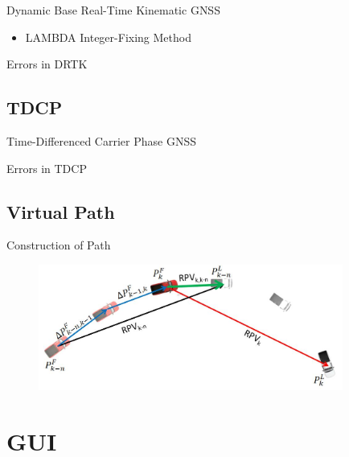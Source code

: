 \documentclass{beamer}
\begin{document}
    \begin{frame}{Dynamic Base Real-Time Kinematic GNSS}
      \begin{itemize}
        \item LAMBDA Integer-Fixing Method
      \end{itemize}
    \end{frame}

    \begin{frame}{Errors in DRTK}
    \end{frame}

  \subsection{TDCP}

    \begin{frame}{Time-Differenced Carrier Phase GNSS}
    \end{frame}

    \begin{frame}{Errors in TDCP}
    \end{frame}

  \subsection{Virtual Path}

    \begin{frame}{Construction of Path}
      \begin{figure}
        \includegraphics[width=10cm]{../graphics/path_algorithm.png}
      \end{figure}
    \end{frame}


\section{GUI}
\end{document}
